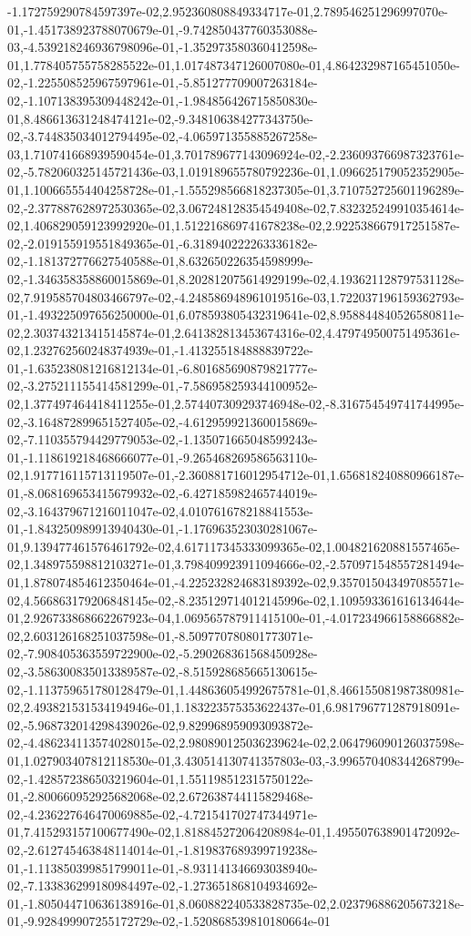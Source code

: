 -1.172759290784597397e-02,2.952360808849334717e-01,2.789546251296997070e-01,-1.451738923788070679e-01,-9.742850437760353088e-03,-4.539218246936798096e-01,-1.352973580360412598e-01,1.778405755758285522e-01,1.017487347126007080e-01,4.864232987165451050e-02,-1.225508525967597961e-01,-5.851277709007263184e-02,-1.107138395309448242e-01,-1.984856426715850830e-01,8.486613631248474121e-02,-9.348106384277343750e-02,-3.744835034012794495e-02,-4.065971355885267258e-03,1.710741668939590454e-01,3.701789677143096924e-02,-2.236093766987323761e-02,-5.782060325145721436e-03,1.019189655780792236e-01,1.096625179052352905e-01,1.100665554404258728e-01,-1.555298566818237305e-01,3.710752725601196289e-02,-2.377887628972530365e-02,3.067248128354549408e-02,7.832325249910354614e-02,1.406829059123992920e-01,1.512216869741678238e-02,2.922538667917251587e-02,-2.019155919551849365e-01,-6.318940222263336182e-02,-1.181372776627540588e-01,8.632650226354598999e-02,-1.346358358860015869e-01,8.202812075614929199e-02,4.193621128797531128e-02,7.919585704803466797e-02,-4.248586948961019516e-03,1.722037196159362793e-01,-1.493225097656250000e-01,6.078593805432319641e-02,8.958844840526580811e-02,2.303743213415145874e-01,2.641382813453674316e-02,4.479749500751495361e-02,1.232762560248374939e-01,-1.413255184888839722e-01,-1.635238081216812134e-01,-6.801685690879821777e-02,-3.275211155414581299e-01,-7.586958259344100952e-02,1.377497464418411255e-01,2.574407309293746948e-02,-8.316754549741744995e-02,-3.164872899651527405e-02,-4.612959921360015869e-02,-7.110355794429779053e-02,-1.135071665048599243e-01,-1.118619218468666077e-01,-9.265468269586563110e-02,1.917716115713119507e-01,-2.360881716012954712e-01,1.656818240880966187e-01,-8.068169653415679932e-02,-6.427185982465744019e-02,-3.164379671216011047e-02,4.010761678218841553e-01,-1.843250989913940430e-01,-1.176963523030281067e-01,9.139477461576461792e-02,4.617117345333099365e-02,1.004821620881557465e-02,1.348975598812103271e-01,3.798409923911094666e-02,-2.570971548557281494e-01,1.878074854612350464e-01,-4.225232824683189392e-02,9.357015043497085571e-02,4.566863179206848145e-02,-8.235129714012145996e-02,1.109593361616134644e-01,2.926733868662267923e-04,1.069565787911415100e-01,-4.017234966158866882e-02,2.603126168251037598e-01,-8.509770780801773071e-02,-7.908405363559722900e-02,-5.290268361568450928e-02,-3.586300835013389587e-02,-8.515928685665130615e-02,-1.113759651780128479e-01,1.448636054992675781e-01,8.466155081987380981e-02,2.493821531534194946e-01,1.183223575353622437e-01,6.981796771287918091e-02,-5.968732014298439026e-02,9.829968959093093872e-02,-4.486234113574028015e-02,2.980890125036239624e-02,2.064796090126037598e-01,1.027903407812118530e-01,3.430514130741357803e-03,-3.996570408344268799e-02,-1.428572386503219604e-01,1.551198512315750122e-01,-2.800660952925682068e-02,2.672638744115829468e-02,-4.236227646470069885e-02,-4.721541702747344971e-01,7.415293157100677490e-02,1.818845272064208984e-01,1.495507638901472092e-02,-2.612745463848114014e-01,-1.819837689399719238e-01,-1.113850399851799011e-01,-8.931141346693038940e-02,-7.133836299180984497e-02,-1.273651868104934692e-01,-1.805044710636138916e-01,8.060882240533828735e-02,2.023796886205673218e-01,-9.928499907255172729e-02,-1.520868539810180664e-01
